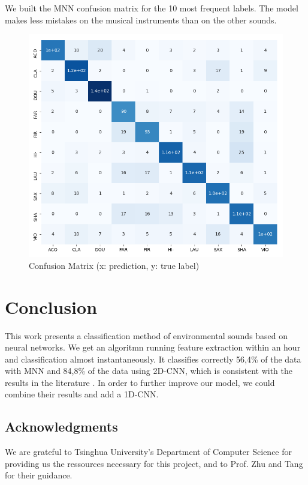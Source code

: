 \documentclass[final]{beamer}
\begin{document}
\begin{frame}[t]
\begin{multicols}{3}
        We built the MNN confusion matrix for the 10 most frequent labels. The model makes less mistakes on the musical instruments than on the other sounds.
		\begin{figure}
		\centering
		\includegraphics[width=0.90\columnwidth]{confusion_matrix.png}
		\caption{Confusion Matrix (x: prediction, y: true label)}
		\end{figure}

\section{Conclusion}

	This work presents a classification method of environmental sounds based on neural networks. We get an algoritmn running feature extraction within an hour and classification almost instantaneously. It classifies correctly 56,4\% of the data with MNN and 84,8\% of the data using 2D-CNN, which is consistent with the results in the literature \cite{ref4} \cite{ref5} \cite{ref6}.
	In order to further improve our model, we could combine their results and add a 1D-CNN.


\subsection{Acknowledgments}
	We are grateful to Tsinghua University's Department of Computer Science for providing us the ressources necessary for this project,
	and to Prof. Zhu and Tang for their guidance.


\end{multicols}
\end{frame}
\end{document}
